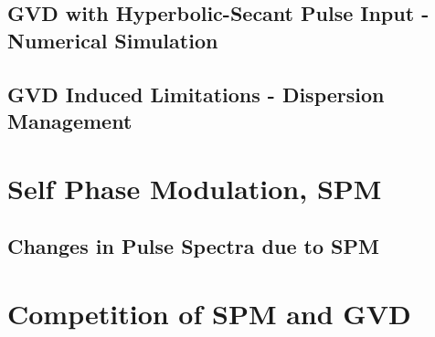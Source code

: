 \documentclass[colorlinks,11pt,a4paper,normalphoto,withhyper,ragged2e]{altareport}
\begin{document}
	
	\subsection{GVD with Hyperbolic-Secant Pulse Input - Numerical Simulation}




	\subsection{GVD Induced Limitations - Dispersion Management}




\section{Self Phase Modulation, SPM}



	\subsection{Changes in Pulse Spectra due to SPM}




\section{Competition of SPM and GVD}







\newpage
{}  %


\end{document}
